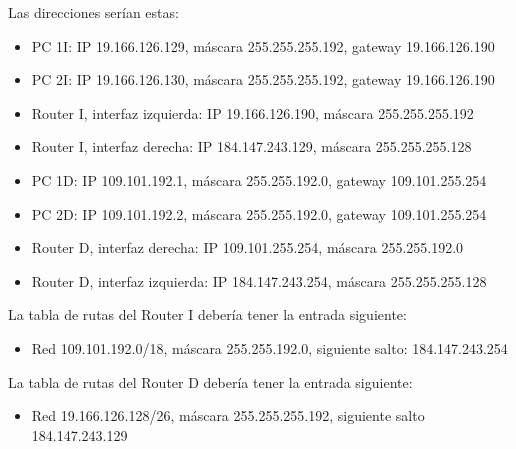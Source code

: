 \documentclass[letterpaper,10pt,spanish]{sphinxmanual}
\begin{document}
\sphinxAtStartPar
Las direcciones serían estas:
\begin{itemize}
\item {} 
\sphinxAtStartPar
PC 1I: IP 19.166.126.129, máscara 255.255.255.192, gateway 19.166.126.190

\item {} 
\sphinxAtStartPar
PC 2I: IP 19.166.126.130, máscara 255.255.255.192, gateway 19.166.126.190

\item {} 
\sphinxAtStartPar
Router I, interfaz izquierda: IP 19.166.126.190, máscara 255.255.255.192

\item {} 
\sphinxAtStartPar
Router I, interfaz derecha: IP 184.147.243.129, máscara 255.255.255.128

\item {} 
\sphinxAtStartPar
PC 1D: IP 109.101.192.1, máscara 255.255.192.0, gateway 109.101.255.254

\item {} 
\sphinxAtStartPar
PC 2D: IP 109.101.192.2, máscara 255.255.192.0, gateway 109.101.255.254

\item {} 
\sphinxAtStartPar
Router D, interfaz derecha: IP 109.101.255.254, máscara 255.255.192.0

\item {} 
\sphinxAtStartPar
Router D, interfaz izquierda: IP 184.147.243.254, máscara 255.255.255.128

\end{itemize}

\sphinxAtStartPar
La tabla de rutas del Router I debería tener la entrada siguiente:
\begin{itemize}
\item {} 
\sphinxAtStartPar
Red 109.101.192.0/18, máscara 255.255.192.0, siguiente salto: 184.147.243.254

\end{itemize}

\sphinxAtStartPar
La tabla de rutas del Router D debería tener la entrada siguiente:
\begin{itemize}
\item {} 
\sphinxAtStartPar
Red 19.166.126.128/26, máscara 255.255.255.192, siguiente salto 184.147.243.129

\end{itemize}
\end{document}
